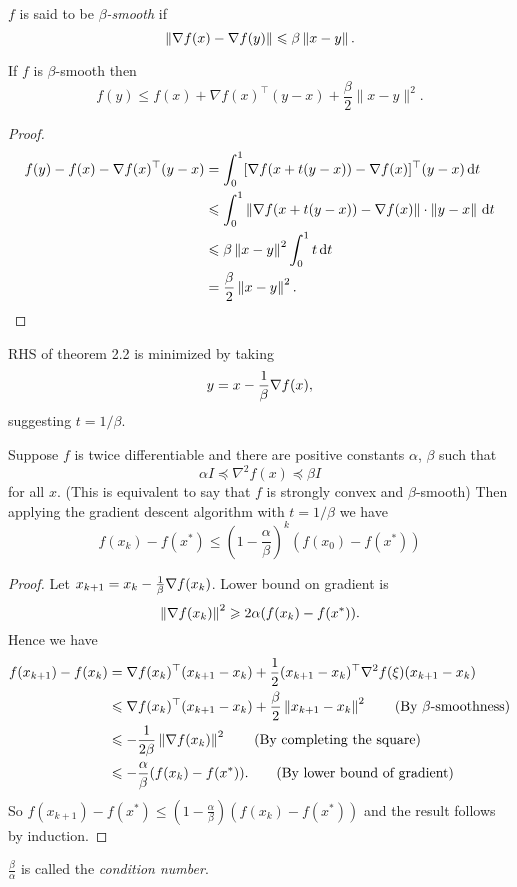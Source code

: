\begin{definition}
    $f$ is said to be \textit{$ \beta $-smooth} if 
    \[
        \left\| \nabla f(x) - \nabla f(y) \right\| \leqslant \beta \left\| x-y \right\|. 
    \]
\end{definition}

\begin{theorem}
    If $f$ is $\beta$-smooth then
\[
f(y) \leq f(x)+\nabla f(x)^{\top}(y-x)+\frac{\beta}{2}\|x-y\|^2. 
\]
\end{theorem}
\begin{proof}
    \begin{align*}
        f(y)-f(x) - \nabla f(x)^\top (y-x) &= \int_{0}^{1} [\nabla f(x+t(y-x)) - \nabla f(x)]^\top (y-x) \,\mathrm{d}t\\ 
        &\leqslant \int_{0}^{1} \left\| \nabla f(x + t(y-x))- \nabla f(x) \right\| \cdot \left\| y-x \right\| \,\mathrm{d}t\\ 
        &\leqslant \beta \left\| x-y \right\|^2 \int_{0}^{1} t \,\mathrm{d}t\\ 
        &= \frac{\beta}{2} \left\| x-y \right\|^2.\qedhere
    \end{align*}
\end{proof}

RHS of theorem 2.2 is minimized by taking 
\[
    y = x - \frac{1}{\beta} \nabla f(x),
\]
suggesting $t = 1/\beta$.

\begin{theorem}
    Suppose $f$ is twice differentiable and there are positive constants $\alpha$, $\beta$ such that
\[
\alpha I \preceq \nabla^2 f(x) \preceq \beta I
\]
for all $x$. (This is equivalent to say that $f$ is strongly convex and $\beta$-smooth) Then applying the gradient descent algorithm with $t=1 / \beta$ we have
\[
f\left(x_k\right)-f\left(x^*\right) \leq\left(1-\frac{\alpha}{\beta}\right)^k\left(f\left(x_0\right)-f\left(x^*\right)\right)
\]
\end{theorem}

\begin{proof}
    Let $ x_{k+1} = x_k - \frac{1}{\beta} \nabla f(x_k) $. Lower bound on gradient is
    \[
        \left\| \nabla f(x_k) \right\|^2 \geqslant 2\alpha (f(x_k)-f(x^*)).
    \]
    Hence we have
    \begin{align*}
        f(x_{k+1}) - f(x_k) &= \nabla f(x_k)^\top (x_{k+1}-x_k) + \frac{1}{2} (x_{k+1}-x_k)^\top \nabla^2 f(\xi) (x_{k+1}-x_k )\\ 
        &\leqslant \nabla f(x_k)^\top (x_{k+1}-x_k) + \frac{\beta}{2} \left\| x_{k+1}-x_k \right\|^2\tag{By $ \beta $-smoothness}\\ 
        &\leqslant -\frac{1}{2\beta} \left\| \nabla f(x_k) \right\|^2 \tag{By completing the square}\\ 
        &\leqslant - \frac{\alpha}{\beta}(f(x_k) - f(x^*)). \tag{By lower bound of gradient}
    \end{align*}
    So $ f(x_{k+1})-f(x^*)\le \left( 1-\frac{\alpha}{\beta} \right)\left( f(x_{k})-f(x^*) \right) $ and the result follows by induction.
\end{proof}
\begin{note}
    $ \frac{\beta}{\alpha} $ is called the \textit{condition number}. 
\end{note}

